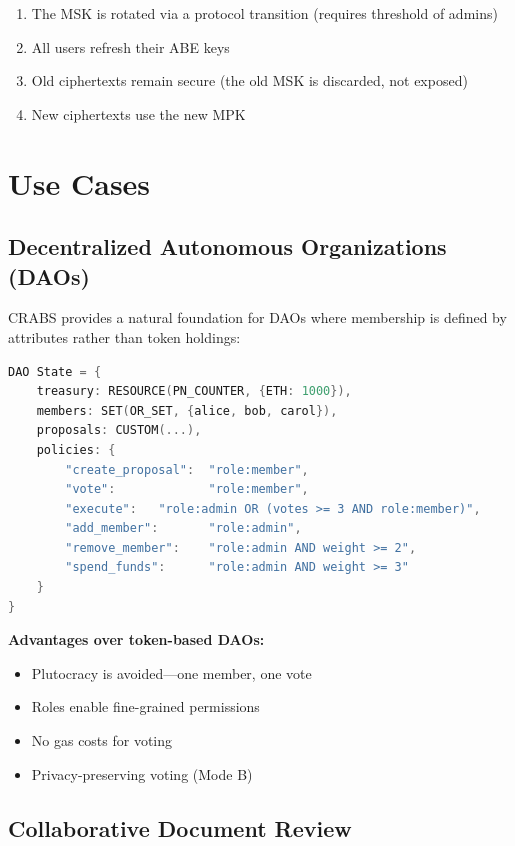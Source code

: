 \documentclass[sigconf,nonacm]{acmart}
\newcommand{\crab}{\textsc{CRABS}}
\begin{document}
\begin{enumerate}
    \item The MSK is rotated via a protocol transition (requires threshold of admins)
    \item All users refresh their ABE keys
    \item Old ciphertexts remain secure (the old MSK is discarded, not exposed)
    \item New ciphertexts use the new MPK
\end{enumerate}

\section{Use Cases}

\subsection{Decentralized Autonomous Organizations (DAOs)}

\crab{} provides a natural foundation for DAOs where membership is defined by attributes rather than token holdings:

\begin{lstlisting}[language=C]
DAO State = {
    treasury: RESOURCE(PN_COUNTER, {ETH: 1000}),
    members: SET(OR_SET, {alice, bob, carol}),
    proposals: CUSTOM(...),
    policies: {
        "create_proposal":  "role:member",
        "vote":             "role:member",
        "execute":   "role:admin OR (votes >= 3 AND role:member)",
        "add_member":       "role:admin",
        "remove_member":    "role:admin AND weight >= 2",
        "spend_funds":      "role:admin AND weight >= 3"
    }
}
\end{lstlisting}

\textbf{Advantages over token-based DAOs:}
\begin{itemize}
    \item Plutocracy is avoided---one member, one vote
    \item Roles enable fine-grained permissions
    \item No gas costs for voting
    \item Privacy-preserving voting (Mode B)
\end{itemize}

\subsection{Collaborative Document Review}
\end{document}

